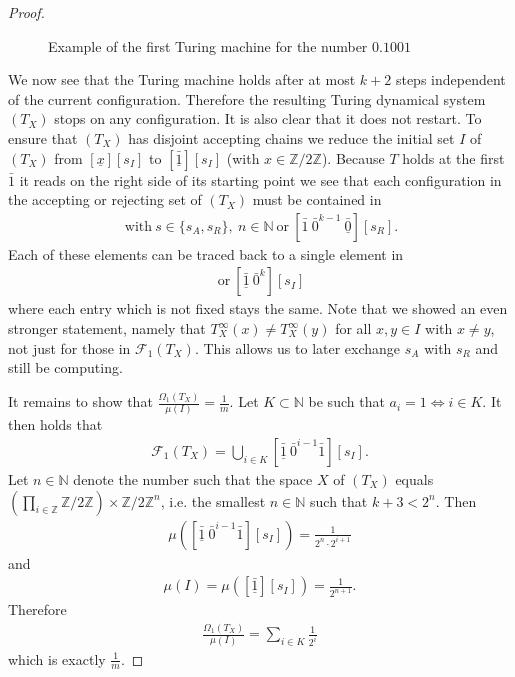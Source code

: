 \documentclass[12pt,a4paper]{scrartcl}
\theoremstyle{plain}
\theoremstyle{definition}
\numberwithin{equation}{section}
\newcommand{\Z}{\mathbb{Z}} %
\newcommand{\N}{\mathbb{N}} %
\newcommand{\2}{\mathbb{Z} / 2 \mathbb{Z}}
\newcommand{\1}{\bar{1}}
\newcommand{\0}{\bar{0}}
\begin{document}
\begin{proof}
\begin{figure}[]
		\caption{Example of the first Turing machine for the number $0.1001$}
		\label{Graphik_erste_TM}
	\end{figure}

	We now see that the Turing machine holds after at most $k+2$ steps independent of the current configuration. Therefore the resulting Turing dynamical system $(T_X)$ stops on any configuration. It is also clear that it does not restart. To ensure that $(T_X)$ has disjoint accepting chains we reduce the initial set $I$ of $(T_X)$ from $[\underline{x}][s_I]$ to $[\underline{\1}][s_I]$ (with $x \in \2$). Because $T$ holds at the first $\1$ it reads on the right side of its starting point we see that each configuration in the accepting or rejecting set of $(T_X)$ must be contained in
	\begin{align*}
		[\1 \ \0^n \ \underline{\1}][s] \ \text{with} \ s \in \{s_A, s_R\}, \ n \in \N \ \text{or} \ [\1 \ \0^{k-1} \ \underline{\0}][s_R].
	\end{align*} 
	Each of these elements can be traced back to a single element in
	\begin{align*}
	[\underline{\1} \ \0^{n} \ \1][s_I] \ \text{or} \ [\underline{\1}  \ \0^{k}][s_I]
	\end{align*} 
	where each entry which is not fixed stays the same. Note that we showed an even stronger statement, namely that $T_X^\infty (x) \neq T_X^\infty (y)$ for all $x, y \in I$ with $x \neq y$, not just for those in $\mathcal{F}_1(T_X)$. This allows us to later exchange $s_A$ with $s_R$ and still be computing.
	
	It remains to show that $\frac{\Omega_1(T_X)}{\mu(I)} = \frac{1}{m}$. Let $K \subset \N$ be such that $a_i = 1 \Leftrightarrow i \in K$. It then holds that
	\begin{align*}
		\mathcal{F}_1(T_X) = \bigcup_{i \in K}[\underline{\1} \ \0^{i-1} \1][s_I].
	\end{align*}
	Let $n \in \N$ denote the number such that the space $X$ of $(T_X)$ equals $(\prod_{i \in \Z} \2) \times \2^n$, i.e. the smallest $n \in \N$ such that $k+3 < 2^n$. Then 
	\begin{align*}
		\mu([\underline{\1} \ \0^{i-1} \1][s_I]) = \frac{1}{2^n \cdot 2^ {i + 1}}
	\end{align*}
	and
	\begin{align*}
		\mu(I) = \mu([\underline{\1}][s_I]) = \frac{1}{2^{n + 1}}.
	\end{align*}
	Therefore 
	\begin{align*}
		\frac{\Omega_1(T_X)}{\mu(I)} = \sum_{i \in K} \frac{1}{2^i}
	\end{align*}
	which is exactly $\frac{1}{m}$.
\end{proof}
\end{document}

